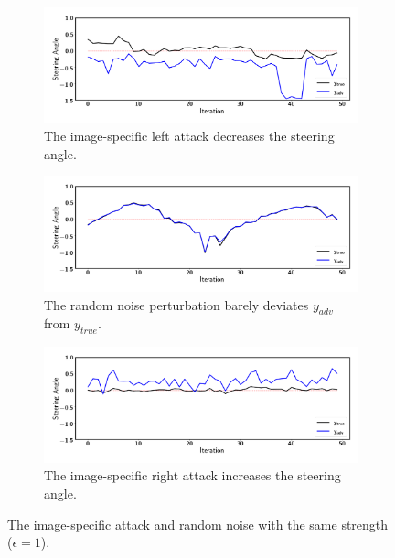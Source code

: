 \begin{figure}[tbph]
    \centering
    \begin{subfigure}[b]{0.8\textwidth}
        \centering
        \includegraphics[width=\textwidth]{figures/chapter_driving/left.png}
        \caption{The image-specific left attack decreases the steering angle.\label{fig:image-specific-left-attack}}
    \end{subfigure}
    \begin{subfigure}[b]{0.8\textwidth}
        \centering
        \includegraphics[width=\textwidth]{figures/chapter_driving/random.png}
        \caption{The random noise perturbation barely deviates $y_{adv}$ from $y_{true}$.}
    \end{subfigure}
    \begin{subfigure}[b]{0.8\textwidth}
        \centering
        \includegraphics[width=\textwidth]{figures/chapter_driving/right.png}
        \caption{The image-specific right attack increases the steering angle.\label{fig:image-specific-right-attack}}
    \end{subfigure}
    \caption{The image-specific attack and random noise with the same strength ($\epsilon = 1$).}
    \label{fig:image-specific-online}
\end{figure}


